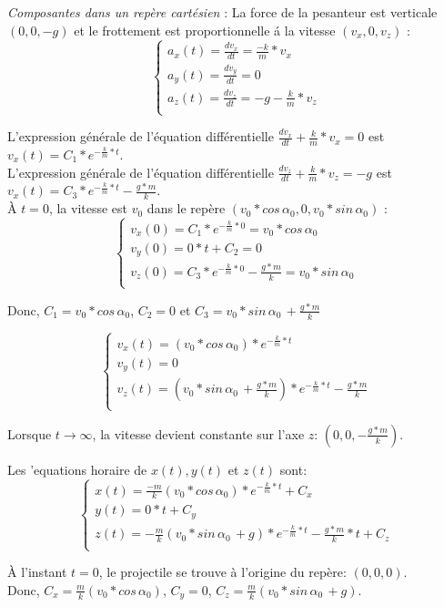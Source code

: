 \documentclass[]{book}
\theoremstyle{definition}
\begin{document}
\emph{Composantes dans un rep\`ere cart\'esien} : 
 La force de la pesanteur est verticale $(0,0,-g)$ et le frottement est proportionnelle \'a la vitesse $(v_x,0,v_z)$ :
$$
\left\{
\begin{array}{l}
 a_x(t) = \frac{dv_x}{dt} = \frac{-k}{m}*v_x \\
 a_y(t) = \frac{dv_y}{dt} =0 \\
 a_z(t) = \frac{dv_z}{dt} = -g - \frac{k}{m} * v_z \\
\end{array}
\right. 
$$

L'expression g\'en\'erale de l'\'equation diff\'erentielle $\frac{dv_x}{dt} + \frac{k}{m}*v_x = 0$ est $v_x(t) = C_1*e^{-\frac{k}{m}*t}$. \\

L'expression g\'en\'erale de l'\'equation diff\'erentielle $\frac{dv_z}{dt} + \frac{k}{m}*v_z = -g$ est $v_x(t) = C_3*e^{-\frac{k}{m}*t} -\frac{g*m}{k}$. \\


\`A $t=0$, la vitesse est $v_0$ dans le rep\`ere $(v_0*cos\, \alpha_0, 0, v_0*sin\, \alpha_0)$ :
$$
\left\{
\begin{array}{l}
 v_x(0) = C_1*e^{-\frac{k}{m}*0} = v_0*cos\, \alpha_0\\
 v_y(0) = 0*t+C_2 = 0 \\
 v_z(0) = C_3*e^{-\frac{k}{m}*0} - \frac{g*m}{k} = v_0*sin\, \alpha_0\\
\end{array}
\right. 
$$

Donc, $C_1 = v_0*cos\, \alpha_0$, $C_2 = 0$ et $C_3 = v_0*sin\, \alpha_0\, + \frac{g*m}{k}$

$$
\left\{
\begin{array}{l}
 v_x(t) = (v_0*cos\, \alpha_0)*e^{-\frac{k}{m}*t}\\
 v_y(t) = 0 \\
 v_z(t) = (v_0*sin\, \alpha_0\, + \frac{g*m}{k})*e^{-\frac{k}{m}*t} - \frac{g*m}{k} \\
\end{array}
\right. 
$$


Lorsque $t \to \infty$, la vitesse devient constante sur l'axe $z$: $(0,0,-\frac{g*m}{k})$.

Les 'equations horaire de $x(t), y(t)$ et $z(t)$ sont: 
$$
\left\{
\begin{array}{l}
 x(t) = \frac{-m}{k}(v_0*cos\, \alpha_0)*e^{-\frac{k}{m}*t} + C_x\\
 y(t) = 0*t + C_y \\
 z(t) = -\frac{m}{k}(v_0*sin\, \alpha_0\, + g)*e^{-\frac{k}{m}*t} - \frac{g*m}{k}*t + C_z\\
\end{array}
\right. 
$$

\`A l'instant $t=0$, le projectile se trouve \`a l'origine du rep\`ere: $(0,0,0)$.\\
Donc, $C_x = \frac{m}{k}(v_0*cos\, \alpha_0)$, $C_y = 0$, $C_z = \frac{m}{k}(v_0*sin\, \alpha_0\, + g)$.
\end{document}
